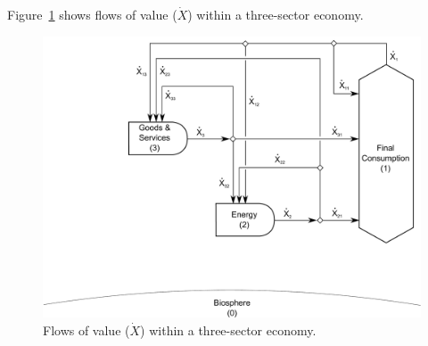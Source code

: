 Figure~\ref{fig:C_value} shows flows of value ($\dot{X}$) 
within a three-sector economy. 

\begin{landscape}
\begin{figure}[!ht]
\centering
\includegraphics[width=0.8\linewidth]{Part_2/Chapter_Values/images/3_sector_value.pdf}
\caption[Flows of value within a three-sector economy]{Flows of value ($\dot{X}$) within a three-sector economy.}
\label{fig:C_value}
\end{figure}
\end{landscape}

